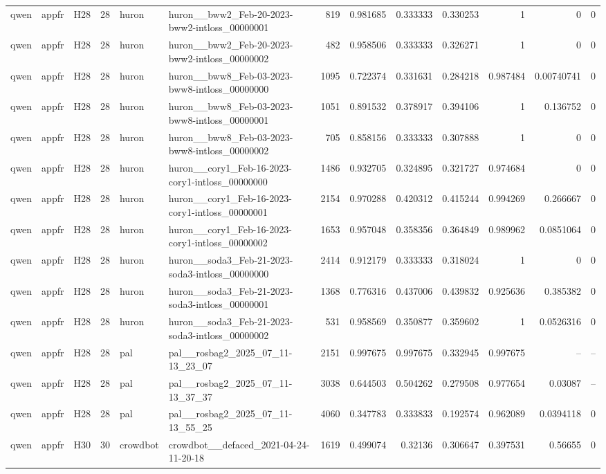 \begin{longtable}{lllrllrrrrrrr}
qwen & appfr & H28 & 28 & huron & huron\_\_bww2\_Feb-20-2023-bww2-intloss\_00000001 & 819 & 0.981685 & 0.333333 & 0.330253 & 1 & 0 & 0 \\
qwen & appfr & H28 & 28 & huron & huron\_\_bww2\_Feb-20-2023-bww2-intloss\_00000002 & 482 & 0.958506 & 0.333333 & 0.326271 & 1 & 0 & 0 \\
qwen & appfr & H28 & 28 & huron & huron\_\_bww8\_Feb-03-2023-bww8-intloss\_00000000 & 1095 & 0.722374 & 0.331631 & 0.284218 & 0.987484 & 0.00740741 & 0 \\
qwen & appfr & H28 & 28 & huron & huron\_\_bww8\_Feb-03-2023-bww8-intloss\_00000001 & 1051 & 0.891532 & 0.378917 & 0.394106 & 1 & 0.136752 & 0 \\
qwen & appfr & H28 & 28 & huron & huron\_\_bww8\_Feb-03-2023-bww8-intloss\_00000002 & 705 & 0.858156 & 0.333333 & 0.307888 & 1 & 0 & 0 \\
qwen & appfr & H28 & 28 & huron & huron\_\_cory1\_Feb-16-2023-cory1-intloss\_00000000 & 1486 & 0.932705 & 0.324895 & 0.321727 & 0.974684 & 0 & 0 \\
qwen & appfr & H28 & 28 & huron & huron\_\_cory1\_Feb-16-2023-cory1-intloss\_00000001 & 2154 & 0.970288 & 0.420312 & 0.415244 & 0.994269 & 0.266667 & 0 \\
qwen & appfr & H28 & 28 & huron & huron\_\_cory1\_Feb-16-2023-cory1-intloss\_00000002 & 1653 & 0.957048 & 0.358356 & 0.364849 & 0.989962 & 0.0851064 & 0 \\
qwen & appfr & H28 & 28 & huron & huron\_\_soda3\_Feb-21-2023-soda3-intloss\_00000000 & 2414 & 0.912179 & 0.333333 & 0.318024 & 1 & 0 & 0 \\
qwen & appfr & H28 & 28 & huron & huron\_\_soda3\_Feb-21-2023-soda3-intloss\_00000001 & 1368 & 0.776316 & 0.437006 & 0.439832 & 0.925636 & 0.385382 & 0 \\
qwen & appfr & H28 & 28 & huron & huron\_\_soda3\_Feb-21-2023-soda3-intloss\_00000002 & 531 & 0.958569 & 0.350877 & 0.359602 & 1 & 0.0526316 & 0 \\
qwen & appfr & H28 & 28 & pal & pal\_\_rosbag2\_2025\_07\_11-13\_23\_07 & 2151 & 0.997675 & 0.997675 & 0.332945 & 0.997675 & -- & -- \\
qwen & appfr & H28 & 28 & pal & pal\_\_rosbag2\_2025\_07\_11-13\_37\_37 & 3038 & 0.644503 & 0.504262 & 0.279508 & 0.977654 & 0.03087 & -- \\
qwen & appfr & H28 & 28 & pal & pal\_\_rosbag2\_2025\_07\_11-13\_55\_25 & 4060 & 0.347783 & 0.333833 & 0.192574 & 0.962089 & 0.0394118 & 0 \\
qwen & appfr & H30 & 30 & crowdbot & crowdbot\_\_defaced\_2021-04-24-11-20-18 & 1619 & 0.499074 & 0.32136 & 0.306647 & 0.397531 & 0.56655 & 0 \\

\end{longtable}

